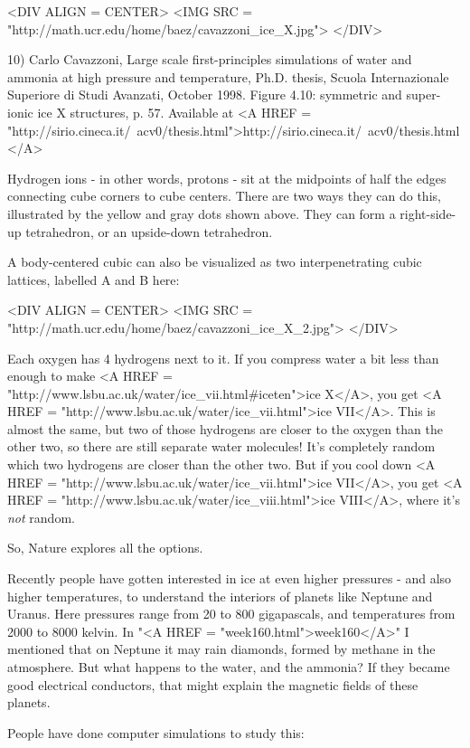 <DIV ALIGN = CENTER>
<IMG SRC = "http://math.ucr.edu/home/baez/cavazzoni_ice_X.jpg">
</DIV>

10) Carlo Cavazzoni, Large scale first-principles simulations of water
and ammonia at high pressure and temperature, Ph.D. thesis, Scuola
Internazionale Superiore di Studi Avanzati, October 1998.  Figure
4.10: symmetric and super-ionic ice X structures, p. 57.  Available at
<A HREF =
"http://sirio.cineca.it/~acv0/thesis.html">http://sirio.cineca.it/~acv0/thesis.html</A>


Hydrogen ions - in other words, protons - sit at the midpoints of half 
the edges connecting cube corners to cube centers.  There are two ways 
they can do this, illustrated by the yellow and gray dots shown above.
They can form a right-side-up tetrahedron, or an upside-down tetrahedron. 

A body-centered cubic can also be visualized as two interpenetrating 
cubic lattices, labelled A and B here:

<DIV ALIGN = CENTER>
<IMG SRC = "http://math.ucr.edu/home/baez/cavazzoni_ice_X_2.jpg">
</DIV>

Each oxygen has 4 hydrogens next to it.  If you compress water a bit
less than enough to make 
<A HREF = "http://www.lsbu.ac.uk/water/ice_vii.html#iceten">ice X</A>,
you get 
<A HREF = "http://www.lsbu.ac.uk/water/ice_vii.html">ice VII</A>.
This is almost the
same, but two of those hydrogens are closer to the oxygen than the
other two, so there are still separate water molecules!  It's completely 
random which two hydrogens are closer than the other two.  But if you 
cool down 
<A HREF = "http://www.lsbu.ac.uk/water/ice_vii.html">ice VII</A>,
you get 
<A HREF = "http://www.lsbu.ac.uk/water/ice_viii.html">ice VIII</A>,
where it's \emph{not} random.

So, Nature explores all the options.

Recently people have gotten interested in ice at even higher pressures
- and also higher temperatures, to understand the interiors of planets
like Neptune and Uranus.  Here pressures range from 20 to 800
gigapascals, and temperatures from 2000 to 8000 kelvin.  In "<A
HREF = "week160.html">week160</A>" I mentioned that on Neptune
it may rain diamonds, formed by methane in the atmosphere.  But what
happens to the water, and the ammonia?  If they became good electrical
conductors, that might explain the magnetic fields of these planets.
 
People have done computer simulations to study this:

